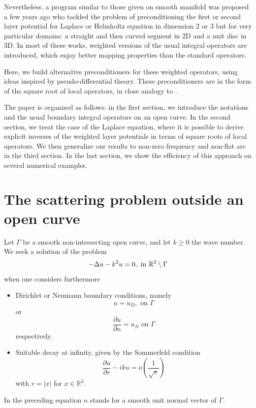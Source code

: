 \documentclass[a4paper]{article}
\begin{document}
Nevertheless, a program similar to those given on smooth manifold was proposed a few years ago \cite{bruno2012second,hiptmair2017closed,jerez2012explicit,hiptmair2014mesh,ramaciotti2017some} who tackled the problem of preconditioning the first or second layer potential
for Laplace or Helmholtz equation in dimension 2 or 3 but for very particular domains: a straight and then curved segment in 2D and a unit disc in 3D. In most of these works, weighted versions of the usual integral operators are introduced, which enjoy better mapping properties than the standard operators. 

Here, we build alternative preconditioners for these weighted operators, using ideas inspired by pseudo-differential theory. These preconditioners are in the form of the square root of local operators, in close analogy to \cite{antoine2007generalized}. 
	
The paper is organized as follows: in the first section, we introduce the notations and the usual boundary integral operators on an open curve. In the second section, we treat the case of the Laplace equation, where it is possible to derive explicit inverses of the weighted layer potentials in terms of square roots of local operators. We then generalize our results to non-zero frequency and non-flat arc in the third section. In the last section, we show the efficiency of this approach on several numerical examples. 

\section{The scattering problem outside an open curve}

Let $\Gamma$ be a smooth non-intersecting open curve, and let $k \geq 0$ the wave number. We seek a solution of the problem
\begin{equation}
	-\Delta u - k^2 u = 0,  \text{ in } \mathbb{R}^2 \setminus \Gamma
	\label{Helmholtz}
\end{equation}
when one considers furthermore
\begin{itemize}
	\item Dirichlet or Neumann boundary conditions, namely
	\begin{equation}
	u = u_D, \text{ on } \Gamma
	\label{Dirichlet}
	\end{equation}
	or
	\begin{equation}
	\dfrac{\partial u}{\partial n} = u_N  \text{ on } \Gamma 
	\label{Neumann}
	\end{equation}
	respectively.
	\item Suitable decay at infinity, given by the Sommerfeld condition
	\begin{equation}
	\dfrac{\partial u}{\partial r} - iku = o\left(\frac{1}{\sqrt{r}}\right)
	\label{Sommerfeld}
	\end{equation}
	with $r=|x|$ for $x\in \mathbb{R}^2$.
\end{itemize}
In the preceding equation $n$ stands for a smooth unit normal vector of $\Gamma$. 
\end{document}
